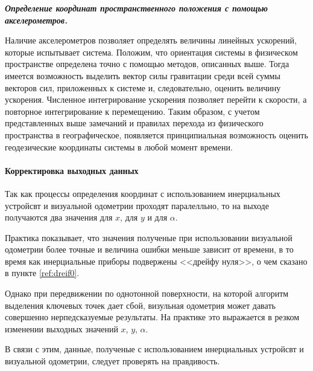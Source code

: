 \textit{\textbf{Определение координат пространственного положения с помощью акселерометров.}}

Наличие акселерометров позволяет определять величины линейных ускорений, которые испытывает система. Положим, что ориентация системы в физическом пространстве определена точно с помощью методов, описанных выше. Тогда имеется возможность выделить вектор силы гравитации среди всей суммы векторов сил, приложенных к системе и, следовательно, оценить величину ускорения. Численное интегрирование ускорения позволяет перейти к скорости, а повторное интегрирование к перемещению. Таким образом, с учетом представленных выше замечаний и правилах перехода из физического пространства в географическое, появляется принципиальная возможность оценить геодезические координаты системы в любой момент времени.

\paragraph{Корректировка выходных данных}
\label{item:outputCorrect}
Так как процессы определения координат с использованием инерциальных устройсвт и визуальной одометрии проходят паралелльно, то на выходе получаются два значения для $x$, для $y$ и для $\alpha$.  

Практика показывает, что значения полученые при использовании визуальной одометрии более точные и величина ошибки меньше зависит от времени, в то время как инерциальные приборы подвержены <<дрейфу нуля>>, о чем сказано в пункте \ref{ref:dreif0}.

Однако при передвижении по однотонной поверхности, на которой алгоритм выделения ключевых точек дает сбой, визульная одометрия может давать совершенно нерпедсказуемые результаты. На практике это выражается в резком изменении выходных значений $x$, $y$, $\alpha$. 

В связи с этим, данные, полученые с использованием инерциальных устройсвт и визуальной одометрии, следует проверять на правдивость. 

